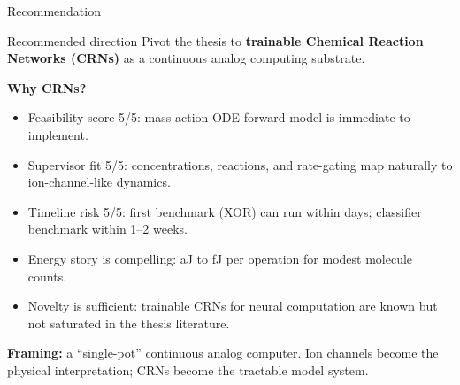 \documentclass[aspectratio=169,11pt]{beamer}
\begin{document}
\begin{frame}{Recommendation}
  \small
  \begin{block}{Recommended direction}
    Pivot the thesis to \textbf{trainable Chemical Reaction Networks (CRNs)} as a continuous analog computing substrate.
  \end{block}

  \vspace{0.15cm}
  \textbf{Why CRNs?}
  \begin{itemize}
    \item Feasibility score 5/5: mass-action ODE forward model is immediate to implement.
    \item Supervisor fit 5/5: concentrations, reactions, and rate-gating map naturally to ion-channel-like dynamics.
    \item Timeline risk 5/5: first benchmark (XOR) can run within days; classifier benchmark within 1--2 weeks.
    \item Energy story is compelling: aJ to fJ per operation for modest molecule counts.
    \item Novelty is sufficient: trainable CRNs for neural computation are known but not saturated in the thesis literature.
  \end{itemize}

  \vspace{0.15cm}
  \textbf{Framing:} a ``single-pot'' continuous analog computer. Ion channels become the physical interpretation; CRNs become the tractable model system.
\end{frame}
\end{document}
